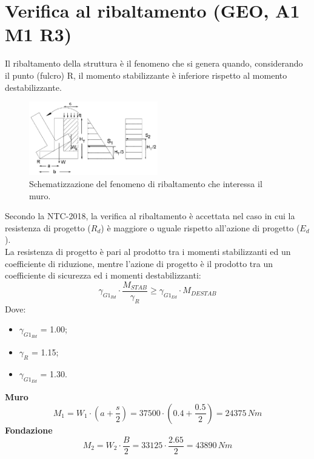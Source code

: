 \section{Verifica al ribaltamento (GEO, A1 M1 R3)}
Il ribaltamento della struttura è il fenomeno che si genera quando, considerando il punto (fulcro) R, il momento stabilizzante è inferiore rispetto al momento destabilizzante.
\begin{figure}[H]
    \centering
    \includegraphics[width=0.5\textwidth]{immagini/ribaltamento.png} \hfill
        \caption{Schematizzazione del fenomeno di ribaltamento che interessa il muro.}
    \label{figure:pesi_muro}
\end{figure}
Secondo la NTC-2018, la verifica al ribaltamento è accettata nel caso in cui la resistenza di progetto ($R_d$) è maggiore o uguale rispetto all'azione di progetto ($E_d$).\\
La resistenza di progetto è pari al prodotto tra i momenti stabilizzanti ed un coefficiente di riduzione, mentre l'azione di progetto è il prodotto tra un coefficiente di sicurezza ed i momenti destabilizzanti:
\begin{equation*}
    \gamma_{G1_{Rd}} \cdot \frac{M_{STAB}}{\gamma_R} \geq \gamma_{G1_{Ed}} \cdot M_{DESTAB}
\end{equation*}
Dove:
\begin{itemize}
    \item $\gamma_{G1_{Rd}}$ = 1.00;
    \item $\gamma_R$ = 1.15;
    \item $\gamma_{G1_{Ed}}$ = 1.30.
\end{itemize}
\textbf{Muro}
\begin{equation*}
    M_1 = W_1 \cdot \left(a + \frac{s}{2}\right) = 37500 \cdot \left(0.4 + \frac{0.5}{2}\right) = 24375 \,N m
\end{equation*}
\textbf{Fondazione}
\begin{equation*}
    M_2 = W_2 \cdot \frac{B}{2} = 33125 \cdot \frac{2.65}{2} = 43890 \, Nm
\end{equation*}
